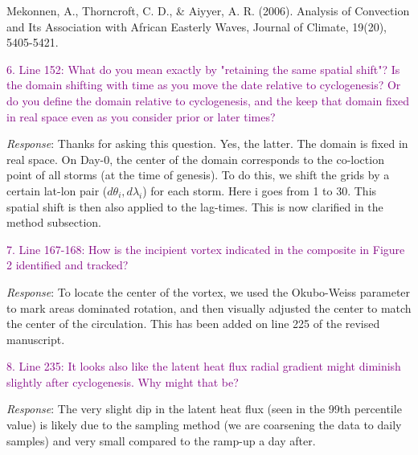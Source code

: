 \documentclass[10pt, letterpaper]{article}
\begin{document}
{{{{{{{Mekonnen, A., Thorncroft, C. D., & Aiyyer, A. R. (2006). Analysis of Convection and Its Association with African Easterly Waves, Journal of Climate, 19(20), 5405-5421.




\vspace{.25in}

\textcolor{purple}{
6. Line 152: What do you mean exactly by "retaining the same spatial shift"? Is the domain shifting with time as you move the date relative to cyclogenesis? Or do you define the domain relative to cyclogenesis, and the keep that domain fixed in real space even as you consider prior or later times?}\\


{\emph{Response}: Thanks for asking this question. Yes, the latter. The domain is fixed in real space. On Day-0, the center of the domain corresponds to the co-loction point of all storms (at the time of genesis). To do this, we shift the grids by a certain lat-lon pair ($d \theta_i, d \lambda_i$) for each storm. Here i goes from 1 to 30. This spatial shift is then also applied to the lag-times. This is now clarified in the method subsection.




\vspace{.25in}

\textcolor{purple}{7. Line 167-168: How is the incipient vortex indicated in the composite in Figure 2 identified and tracked?}\\

{\emph{Response}: To locate the center of the vortex, we used the Okubo-Weiss parameter to mark areas dominated rotation, and then visually adjusted the center to match the center of the circulation. This has been added on line 225 of the revised manuscript.


\vspace{.25in}

\textcolor{purple}{8. Line 235: It looks also like the latent heat flux radial gradient might diminish slightly after cyclogenesis. Why might that be?}\\


{\emph{Response}: The very slight dip in the latent heat flux (seen in the 99th percentile value) is likely due to the sampling method (we are coarsening the data to daily samples) and very small compared to the ramp-up a day after. 

\vspace{.25in}



}}}}}}}}}}
\end{document}
